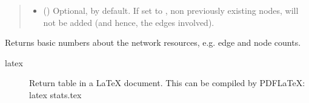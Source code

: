 \documentclass[letterpaper,10pt,english]{sphinxmanual}
\begin{document}
\begin{fulllineitems}
\begin{fulllineitems}
\begin{quote}
\begin{description}
\begin{itemize}
\item {} 
 () \textendash{} Optional,  by default. If set to , non
previously existing nodes, will not be added (and hence, the
edges involved).

\end{itemize}

\end{description}\end{quote}

\end{fulllineitems}


\begin{fulllineitems}
\label{\detokenize{reference:pypath.main.PyPath.basic_stats}}
Returns basic numbers about the network resources, e.g. edge and
node counts.
\begin{description}
\item[{latex}] \leavevmode
Return table in a LaTeX document. This can be compiled by
PDFLaTeX:
latex stats.tex

\end{description}

\end{fulllineitems}


\begin{fulllineitems}
\label{\detokenize{reference:pypath.main.PyPath.basic_stats_intergroup}}
\end{fulllineitems}



\end{fulllineitems}
\end{document}
